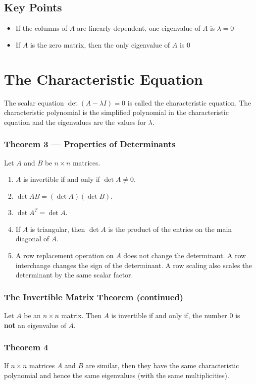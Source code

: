 \documentclass{article}
\begin{document}
\subsection*{Key Points}
\begin{itemize}
    \item If the columns of $A$ are linearly dependent, one eigenvalue of $A$ is $\lambda=0$
    \item If $A$ is the zero matrix, then the only eigenvalue of $A$ is $0$
\end{itemize}

\section*{The Characteristic Equation}
The scalar equation $\det (A-\lambda I) = 0$ is called the characteristic equation. The
characteristic polynomial is the simplified polynomial in the characteristic equation and the
eigenvalues are the values for $\lambda$.
\subsubsection*{Theorem 3 --- Properties of Determinants}
Let $A$ and $B$ be $n\times n$ matrices.
\begin{enumerate}
    \item $A$ is invertible if and only if $\det A \neq 0$.
    \item $\det AB=(\det A)(\det B)$.
    \item $\det A^T = \det A$.
    \item If $A$ is triangular, then $\det A$ is the product of the entries on the main diagonal of
    $A$.
    \item A row replacement operation on $A$ does not change the determinant. A row interchange
    changes the sign of the determinant. A row scaling also scales the determinant by the same
    scalar factor.
\end{enumerate}

\subsubsection*{The Invertible Matrix Theorem (continued)}
Let $A$ be an $n\times n$ matrix. Then $A$ is invertible if and only if, the number $0$ is
\textbf{not} an eigenvalue of $A$.

\subsubsection*{Theorem 4}
If $n\times n$ matrices $A$ and $B$ are similar, then they have the same characteristic polynomial
and hence the same eigenvalues (with the same multiplicities).
\end{document}
